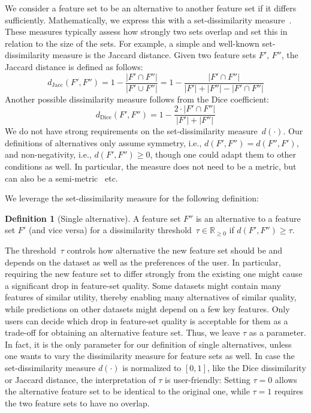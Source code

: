 \documentclass{article}
\theoremstyle{definition}
\newtheorem{definition}{Definition}
\begin{document}
We consider a feature set to be an alternative to another feature set if it differs sufficiently.
Mathematically, we express this with a set-dissimilarity measure~\cite{choi2010survey, egghe2009new}.
These measures typically assess how strongly two sets overlap and set this in relation to the size of the sets.
For example, a simple and well-known set-dissimilarity measure is the Jaccard distance.
Given two feature sets $F'$, $F''$, the Jaccard distance is defined as follows:
%
\begin{equation}
	d_{\text{Jacc}}(F',F'') = 1 - \frac{|F' \cap F''|}{|F' \cup F''|} = 1 - \frac{|F' \cap F''|}{|F'| + |F''| - |F' \cap F''|}
	\label{eq:afs:jaccard}
\end{equation}
%
Another possible dissimilarity measure follows from the Dice coefficient:
%
\begin{equation}
	d_{\text{Dice}}(F',F'') = 1 - \frac{2 \cdot |F' \cap F''|}{|F'| + |F''|}
	\label{eq:afs:dice}
\end{equation}
%
We do not have strong requirements on the set-dissimilarity measure~$d(\cdot)$.
Our definitions of alternatives only assume symmetry, i.e., $d(F',F'')=d(F'',F')$, and non-negativity, i.e., $d(F',F'') \geq 0$, though one could adapt them to other conditions as well.
In particular, the measure does not need to be a metric, but can also be a semi-metric~\cite{wilson1931semi} etc.

We leverage the set-dissimilarity measure for the following definition:
%
\begin{definition}[Single alternative]
	A feature set $F''$ is an alternative to a feature set $F'$ (and vice versa) for a dissimilarity threshold~$\tau \in \mathbb{R}_{\geq 0}$ if $d(F',F'') \geq \tau$.
	\label{def:afs:single-alternative}
\end{definition}
%
The threshold~$\tau$ controls how alternative the new feature set should be and depends on the dataset as well as the preferences of the user.
In particular, requiring the new feature set to differ strongly from the existing one might cause a significant drop in feature-set quality.
Some datasets might contain many features of similar utility, thereby enabling many alternatives of similar quality, while predictions on other datasets might depend on a few key features.
Only users can decide which drop in feature-set quality is acceptable for them as a trade-off for obtaining an alternative feature set.
Thus, we leave $\tau$ as a parameter.
In fact, it is the only parameter for our definition of single alternatives, unless one wants to vary the dissimilarity measure for feature sets as well.
In case the set-dissimilarity measure $d(\cdot)$ is normalized to $[0,1]$, like the Dice dissimilarity or Jaccard distance, the interpretation of $\tau$ is user-friendly:
Setting $\tau=0$ allows the alternative feature set to be identical to the original one, while $\tau=1$ requires the two feature sets to have no overlap.
\end{document}
